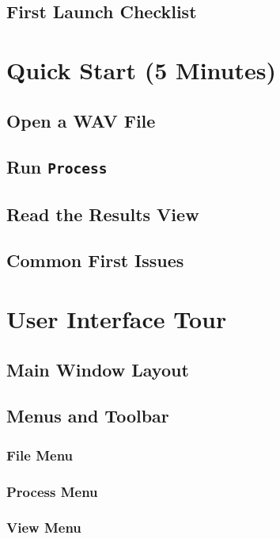 \documentclass[11pt]{report}
\begin{document}
    \section{First Launch Checklist}
    
    \chapter{Quick Start (5 Minutes)}
    \section{Open a WAV File}
    \section{Run \texttt{Process}}
    \section{Read the Results View}
    \section{Common First Issues}
    
    \chapter{User Interface Tour}
    \section{Main Window Layout}
    
    \section{Menus and Toolbar}
    \subsection{File Menu}
    \subsection{Process Menu}
    \subsection{View Menu}
\end{document}
